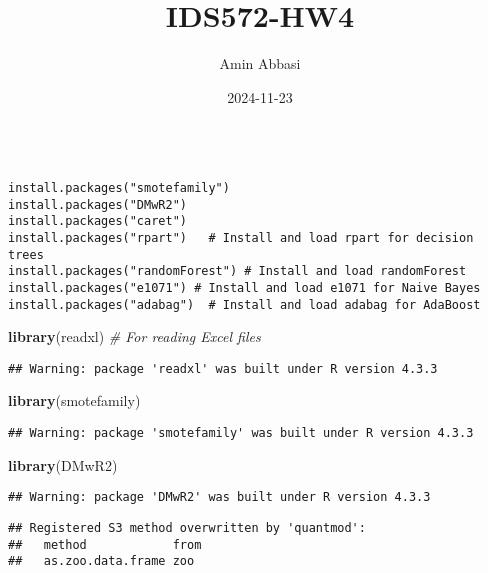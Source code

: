 \documentclass[
]{article}
\title{IDS572-HW4}
\author{Amin Abbasi}
\date{2024-11-23}
\newenvironment{Shaded}{\begin{snugshade}}{\end{snugshade}}
\newcommand{\CommentTok}[1]{\textcolor[rgb]{0.56,0.35,0.01}{\textit{#1}}}
\newcommand{\FunctionTok}[1]{\textcolor[rgb]{0.13,0.29,0.53}{\textbf{#1}}}
\newcommand{\NormalTok}[1]{#1}
\begin{document}
\maketitle

\label{r}%
\begin{verbatim}

install.packages("smotefamily")
install.packages("DMwR2")
install.packages("caret")
install.packages("rpart")   # Install and load rpart for decision trees
install.packages("randomForest") # Install and load randomForest
install.packages("e1071") # Install and load e1071 for Naive Bayes
install.packages("adabag")  # Install and load adabag for AdaBoost
\end{verbatim}

\begin{Shaded}
\begin{Highlighting}[]
\FunctionTok{library}\NormalTok{(readxl)  }\CommentTok{\# For reading Excel files}
\end{Highlighting}
\end{Shaded}

\begin{verbatim}
## Warning: package 'readxl' was built under R version 4.3.3
\end{verbatim}

\begin{Shaded}
\begin{Highlighting}[]
\FunctionTok{library}\NormalTok{(smotefamily)}
\end{Highlighting}
\end{Shaded}

\begin{verbatim}
## Warning: package 'smotefamily' was built under R version 4.3.3
\end{verbatim}

\begin{Shaded}
\begin{Highlighting}[]
\FunctionTok{library}\NormalTok{(DMwR2)}
\end{Highlighting}
\end{Shaded}

\begin{verbatim}
## Warning: package 'DMwR2' was built under R version 4.3.3
\end{verbatim}

\begin{verbatim}
## Registered S3 method overwritten by 'quantmod':
##   method            from
##   as.zoo.data.frame zoo
\end{verbatim}
\end{document}
